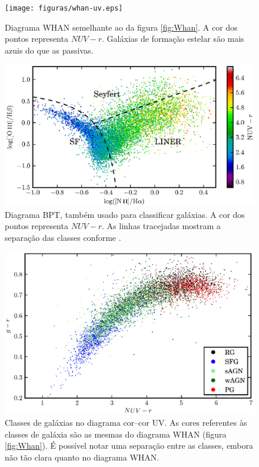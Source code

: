 \begin{figure}
	\texttt{[image: figuras/whan-uv.eps]}
	\caption[Cores ultravioleta no diagrama WHAN.]
	{Diagrama WHAN semelhante ao da figura \ref{fig:Whan}. A cor dos pontos
	representa $NUV-r$. Galáxias de formação estelar são mais azuis do que
	as passivas.}
	\label{fig:WhanUV}
\end{figure}

\begin{figure}
	\includegraphics{figuras/bpt-uv.eps}
	\caption[Cores ultravioleta no diagrama BPT.]
	{Diagrama BPT, também usado para classificar galáxias. A cor dos
	pontos representa $NUV-r$. As linhas tracejadas mostram a separação das
	classes conforme \citet{CidFernandes2010}.}
	\label{fig:BPTUV}
\end{figure}

\begin{figure}
	\includegraphics{figuras/uvcolor-color-class.eps}
	\caption[Diagrama cor--cor UV de acordo com o tipo de galáxia.]
	{Classes de galáxias no diagrama cor--cor UV. As cores referentes às classes de
	galáxia são as mesmas do diagrama WHAN (figura \ref{fig:Whan}). É possível
	notar uma separação entre as classes, embora não tão clara quanto no diagrama
	WHAN.}
	\label{fig:ColorClass}
\end{figure}

